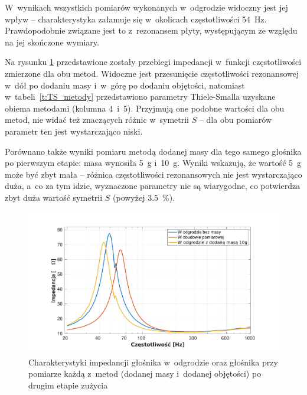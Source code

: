\documentclass[12pt]{oska}
\begin{document}
	W~wynikach wszystkich pomiarów wykonanych w~odgrodzie widoczny jest jej wpływ -- charakterystyka załamuje się w~okolicach częstotliwości \SI{54}{\hertz}. Prawdopodobnie związane jest to z~rezonansem płyty, występującym ze względu na jej skończone wymiary.
	
	Na rysunku \ref{r:metody} przedstawione zostały przebiegi impedancji w~funkcji częstotliwości zmierzone dla obu metod. Widoczne jest przesunięcie częstotliwości rezonansowej w~dół po dodaniu masy i~w~górę po dodaniu objętości, natomiast w~tabeli~\ref{t:TS_metody} przedstawiono parametry Thiele-Smalla uzyskane obiema metodami (kolumna 4~i~5). Przyjmują one podobne wartości dla obu metod, nie widać też znaczących różnic w~symetrii $S$ -- dla obu pomiarów parametr ten jest wystarczająco niski. 
	
	Porównano także wyniki pomiaru metodą dodanej masy dla tego samego głośnika po pierwszym etapie: masa wynosiła \SI{5}{\gram} i~\SI{10}{\gram}. Wyniki wskazują, że wartość \SI{5}{\gram} może być zbyt mała -- różnica częstotliwości rezonansowych nie jest wystarczająco duża, a~co za tym idzie, wyznaczone parametry nie są wiarygodne, co potwierdza zbyt duża wartość symetrii $S$ (powyżej \SI{3,5}{\%}).
	
	\begin{figure}[!ht]
		\centering
		\includegraphics[width=.8\textwidth,trim={2cm .5cm 2cm 1cm},clip]{metody_2glosnik.pdf}
		\caption{Charakterystyki impedancji głośnika w~odgrodzie oraz głośnika przy pomiarze każdą z~metod (dodanej masy i~dodanej objętości) po drugim etapie zużycia}
		\label{r:metody}
	\end{figure}
	
\end{document}
